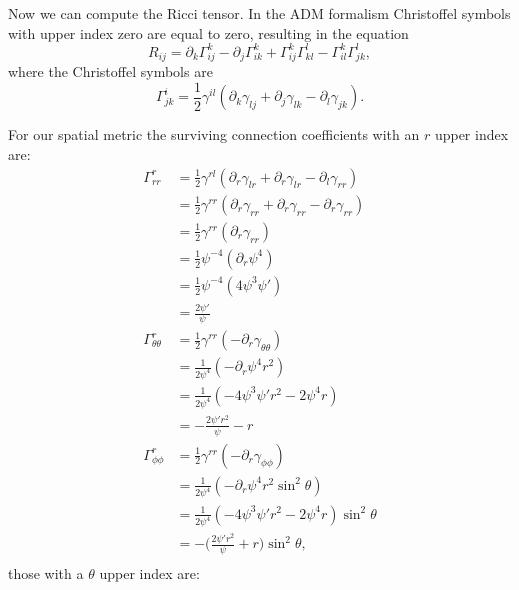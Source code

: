 \documentclass[12pt]{article}
\numberwithin{equation}{section}
\begin{document}
Now we can compute the Ricci tensor.  In the ADM formalism Christoffel symbols with upper index zero are equal to zero, resulting in the equation
\begin{equation}
R_{ij} = \partial_k \Gamma^k_{ij} - \partial_j \Gamma^k_{ik} + \Gamma^k_{ij} \Gamma^l_{kl} - \Gamma^k_{il} \Gamma^l_{jk},
\end{equation}
where the Christoffel symbols are
\begin{equation}
\Gamma^i_{jk} = \frac{1}{2} \gamma^{il} (\partial_k \gamma_{lj} + \partial_j \gamma_{lk} - \partial_l \gamma_{jk}).
\end{equation}

For our spatial metric the surviving connection coefficients with an $r$ upper index are:
\begin{equation}
\begin{aligned}
\Gamma^{r}_{rr} &= \frac{1}{2} \gamma^{rl} (\partial_r \gamma_{lr} + \partial_r \gamma_{lr} - \partial_l \gamma_{rr})\\
&= \frac{1}{2} \gamma^{rr} (\partial_r \gamma_{rr} + \partial_r \gamma_{rr} - \partial_r \gamma_{rr})\\
&= \frac{1}{2} \gamma^{rr} (\partial_r \gamma_{rr})\\
&= \frac{1}{2} \psi^{-4} (\partial_r \psi^4)\\
&= \frac{1}{2} \psi^{-4} (4 \psi^3 \psi')\\
&= \frac{2 \psi'}{\psi} \\
\Gamma^r_{\theta \theta} &= \frac{1}{2} \gamma^{r r} (- \partial_r \gamma_{\theta \theta}) \\
&= \frac{1}{2 \psi^4} (- \partial_r \psi^4 r^2 ) \\
&= \frac{1}{2 \psi^4} (- 4 \psi^3 \psi' r^2 - 2 \psi^4 r ) \\
&= - \frac{2 \psi' r^2}{\psi} - r \\
\Gamma^r_{\phi \phi} &= \frac{1}{2} \gamma^{r r} ( - \partial_r \gamma_{\phi \phi}) \\
&= \frac{1}{2 \psi^4} ( - \partial_r \psi^4 r^2 \sin^2 \theta) \\
&= \frac{1}{2 \psi^4} ( - 4 \psi^3 \psi' r^2 - 2 \psi^4 r ) \sin^2 \theta \\
&= - \Big( \frac{2 \psi' r^2}{\psi} + r \Big) \sin^2 \theta, \\
\end{aligned}
\end{equation}
those with a $\theta$ upper index are:
\end{document}
